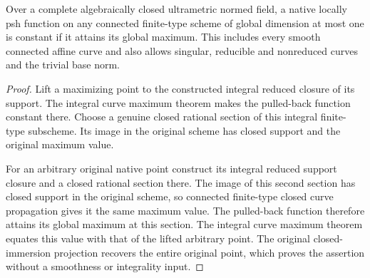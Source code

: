 \begin{theorem}
\label{thm:fc-connected-finite-type-curve-maximum}
\leanok
{}
Over a complete algebraically closed ultrametric normed field, a native locally
psh function on any connected finite-type scheme of global dimension at most
one is constant if it attains its global maximum. This includes every smooth
connected affine curve and also allows singular, reducible and nonreduced
curves and the trivial base norm.
\end{theorem}
\begin{proof}
Lift a maximizing point to the constructed integral reduced closure of its
support. The integral curve maximum theorem makes the pulled-back function
constant there. Choose a genuine closed rational section of this integral
finite-type subscheme. Its image in the original scheme has closed support
and the original maximum value.

For an arbitrary original native point construct its integral reduced support
closure and a closed rational section there. The image of this second section
has closed support in the original scheme, so connected finite-type closed
curve propagation gives it the same maximum value. The pulled-back function
therefore attains its global maximum at this section. The integral curve
maximum theorem equates this value with that of the lifted arbitrary point.
The original closed-immersion projection recovers the entire original point,
which proves the assertion without a smoothness or integrality input.
\end{proof}
